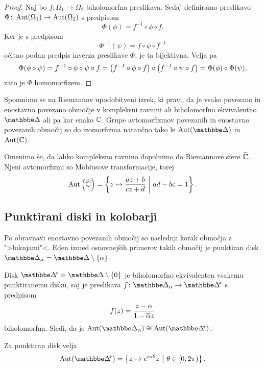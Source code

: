 \begin{proof}
Naj bo $f \colon \Omega_1 \to \Omega_2$ biholomorfna preslikava.
Sedaj definiramo preslikavo
$\Phi \colon \operatorname{Aut}(\Omega_1) \to \operatorname{Aut}(\Omega_2)$ s predpisom
\[
\Phi(\phi) = f^{-1} \circ \phi \circ f.
\]
Ker je s predpisom
\[
\Phi^{-1}(\psi) = f \circ \psi \circ f^{-1}
\]
očitno podan predpis inverza preslikave $\Phi$, je ta bijektivna.
Velja pa
\[
\Phi(\phi \circ \psi) = f^{-1} \circ \phi \circ \psi \circ f =
\left(f^{-1} \circ \phi \circ f\right) \circ
\left(f^{-1} \circ \psi \circ f\right) =
\Phi(\phi) \circ \Phi(\psi),
\]
zato je $\Phi$ homomorfizem.
\end{proof}

Spomnimo se na Riemannov upodobitveni izrek, ki pravi, da je
vsako povezano in enostavno povezano območje v kompleksni ravnini
ali biholomorfno ekvivalentno $\dsk$ ali pa kar enako $\mathbb{C}$. Grupe
avtomorfizmov povezanih in enostavno povezanih območij so do
izomorfizma natančno tako le $\Aut(\dsk)$ in $\operatorname{Aut}(\mathbb{C})$.

Omenimo še, da lahko kompleksno ravnino dopolnimo do Riemannove
sfere $\widehat{\mathbb{C}}$. Njeni avtomorfizmi so Möbiusove transformacije, torej
\[
\operatorname{Aut} \left(\widehat{\mathbb{C}}\right) =
\left\{z \mapsto \frac{az + b}{cz + d}~\middle\vert~ad - bc = 1\right\}.
\]

\subsection{Punktirani diski in kolobarji}

Po obravnavi enostavno povezanih območij so naslednji korak
območja z ">luknjami"<. Eden izmed osnovnejših primerov takih
območij je punktiran disk
$\dsk_\alpha = \dsk \setminus \set{\alpha}$.

Disk $\dskx = \dsk \setminus \set{0}$ je biholomorfno
ekvivalenten vsakemu punktiranemu disku, saj je preslikava
$f \colon \dsk_\alpha \to \dskx$ s predpisom
\[
f(z) = \frac{z - \alpha}{1 - \overline{\alpha} z}
\]
biholomorfna. Sledi, da je
$\Aut(\dsk_\alpha) \cong \Aut(\dskx)$.

\begin{trditev}
Za punktiran disk velja
\[
\Aut(\dskx) =
\setb{z \mapsto e^{i \pi \theta} z}{\theta \in [0, 2\pi)}.
\]
\end{trditev}

